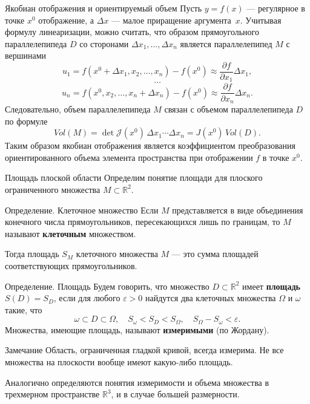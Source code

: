 \documentclass[8pt]{beamer}
\newcommand{\pp}[2]{\frac{\partial #1}{\partial #2}}
\begin{document}
\begin{frame}{Якобиан отображения и ориентируемый объем}
Пусть $y = f(x)$ --- регулярное в точке $x^0$ отображение, а $\Delta x$ --- малое приращение аргумента~$x$. Учитывая формулу линеаризации, можно считать, что образом прямоугольного параллелепипеда $D$ со сторонами $\Delta x_1,\ldots,\Delta x_n$ является параллелепипед $M$ с вершинами 
$$u_1=f(x^0+\Delta x_1,x_2,\ldots,x_n)-f(x^0) \approx \pp{f}{x_1}\Delta x_1,$$
$$\ldots$$
$$ u_n = f(x^0,x_2,\ldots,x_n+\Delta x_n)-f(x^0) \approx \pp{f}{x_n}\Delta x_n.$$
Следовательно, объем параллелепипеда $M$ связан с объемом параллелепипеда $D$ по формуле
$$Vol(M) = \det\mathcal{J}(x^0)\, \Delta x_1\cdots\Delta x_n = J(x^0)\, Vol(D).$$
Таким образом якобиан отображения является коэффициентом преобразования ориентированного объема элемента пространства при отображении $f$ в точке $x^0$.
\end{frame}

\begin{frame}{Площадь плоской области}
Определим понятие площади для плоского ограниченного множества $M\subset\mathbb{R}^2$.
\begin{block}{Определение. Клеточное множество}
Если $M$ представляется в виде объединения конечного числа прямоугольников, пересекающихся лишь по границам, то $M$ называют {\bf клеточным} множеством. 
\end{block}
Тогда площадь $S_M$ клеточного множества $M$ --- это сумма площадей соответствующих прямоугольников. 
\begin{block}{Определение. Площадь}
Будем говорить, что множество $D\subset\mathbb{R}^2$ имеет {\bf площадь} $S(D) = S_D$, если для любого $\varepsilon>0$ найдутся два клеточных множества $\Omega$ и $\omega$ такие, что 
$$\omega\subset D \subset \Omega,\quad S_\omega<S_D<S_\Omega,\quad S_\Omega-S_\omega<\varepsilon.$$
Множества, имеющие площадь, называют {\bf измеримыми} (по Жордану).
\end{block}
\begin{block}{Замечание}
Область, ограниченная гладкой кривой, всегда измерима. Не все множества на плоскости вообще имеют какую-либо площадь.
\end{block}
Аналогично определяются понятия измеримости и объема множества в трехмерном пространстве $\mathbb{R}^3$, и в случае большей размерности.
\end{frame}
\end{document}
